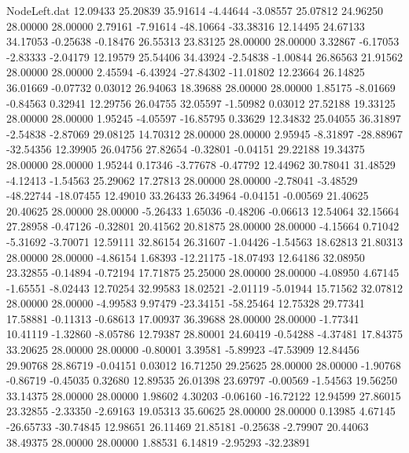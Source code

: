 \begin{filecontents}{NodeLeft.dat}
  12.09433   25.20839   35.91614    -4.44644   -3.08557   25.07812   24.96250   28.00000   28.00000    2.79161   -7.91614  -48.10664  -33.38316
  12.14495   24.67133   34.17053    -0.25638   -0.18476   26.55313   23.83125   28.00000   28.00000    3.32867   -6.17053   -2.83333   -2.04179
  12.19579   25.54406   34.43924    -2.54838   -1.00844   26.86563   21.91562   28.00000   28.00000    2.45594   -6.43924  -27.84302  -11.01802
  12.23664   26.14825   36.01669    -0.07732    0.03012   26.94063   18.39688   28.00000   28.00000    1.85175   -8.01669   -0.84563    0.32941
  12.29756   26.04755   32.05597    -1.50982    0.03012   27.52188   19.33125   28.00000   28.00000    1.95245   -4.05597  -16.85795    0.33629
  12.34832   25.04055   36.31897    -2.54838   -2.87069   29.08125   14.70312   28.00000   28.00000    2.95945   -8.31897  -28.88967  -32.54356
  12.39905   26.04756   27.82654    -0.32801   -0.04151   29.22188   19.34375   28.00000   28.00000    1.95244    0.17346   -3.77678   -0.47792
  12.44962   30.78041   31.48529    -4.12413   -1.54563   25.29062   17.27813   28.00000   28.00000   -2.78041   -3.48529  -48.22744  -18.07455
  12.49010   33.26433   26.34964    -0.04151   -0.00569   21.40625   20.40625   28.00000   28.00000   -5.26433    1.65036   -0.48206   -0.06613
  12.54064   32.15664   27.28958    -0.47126   -0.32801   20.41562   20.81875   28.00000   28.00000   -4.15664    0.71042   -5.31692   -3.70071
  12.59111   32.86154   26.31607    -1.04426   -1.54563   18.62813   21.80313   28.00000   28.00000   -4.86154    1.68393  -12.21175  -18.07493
  12.64186   32.08950   23.32855    -0.14894   -0.72194   17.71875   25.25000   28.00000   28.00000   -4.08950    4.67145   -1.65551   -8.02443
  12.70254   32.99583   18.02521    -2.01119   -5.01944   15.71562   32.07812   28.00000   28.00000   -4.99583    9.97479  -23.34151  -58.25464
  12.75328   29.77341   17.58881    -0.11313   -0.68613   17.00937   36.39688   28.00000   28.00000   -1.77341   10.41119   -1.32860   -8.05786
  12.79387   28.80001   24.60419    -0.54288   -4.37481   17.84375   33.20625   28.00000   28.00000   -0.80001    3.39581   -5.89923  -47.53909
  12.84456   29.90768   28.86719    -0.04151    0.03012   16.71250   29.25625   28.00000   28.00000   -1.90768   -0.86719   -0.45035    0.32680
  12.89535   26.01398   23.69797    -0.00569   -1.54563   19.56250   33.14375   28.00000   28.00000    1.98602    4.30203   -0.06160  -16.72122
  12.94599   27.86015   23.32855    -2.33350   -2.69163   19.05313   35.60625   28.00000   28.00000    0.13985    4.67145  -26.65733  -30.74845
  12.98651   26.11469   21.85181    -0.25638   -2.79907   20.44063   38.49375   28.00000   28.00000    1.88531    6.14819   -2.95293  -32.23891

\end{filecontents}

